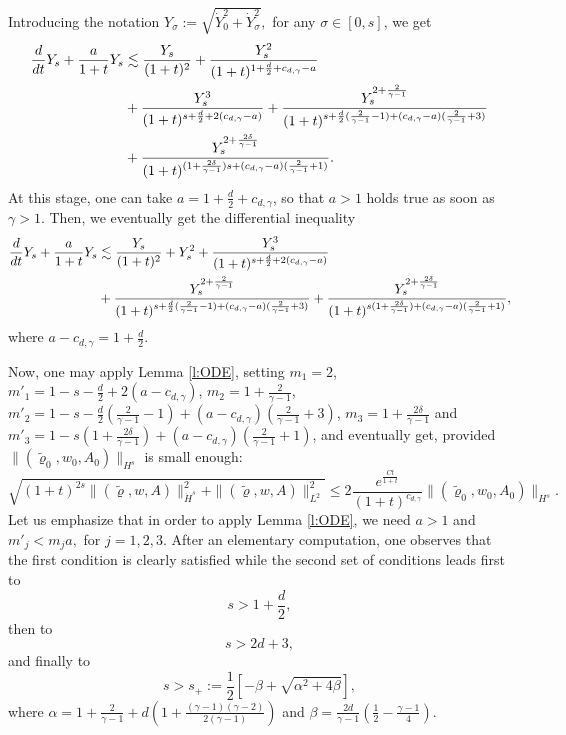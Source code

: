 \documentclass[11pt,twoside]{amsart}
\newcommand{\tildrho}{\tilde{\varrho}}
\begin{document}
 Introducing the notation 
$Y_\sigma:=\sqrt{\dot Y_0^2+\dot Y_\sigma^2},$ for any $\sigma \in [0,s]$, we get
\begin{align}\label{eq:Y_s}
\frac d{dt}Y_s+\frac a{1+t}Y_s
&\lesssim\frac{Y_s}{(1+t)^2}+\frac{Y_s^2}{(1+t)^{1+\frac d2+c_{d,\gamma}-a}} \\
& +\frac{Y_s^3}{(1+t)^{s+\frac{d}{2}+2(c_{d,\gamma}-a)}}
+
\frac{Y_s^{2+\frac{2}{\gamma-1}}}{(1+t)^{s+\frac{d}{2}(\frac{2}{\gamma-1}-1)+(c_{d,\gamma}-a)(\frac{2}{\gamma-1}+3)}}
\notag \\
&
+
\frac{Y_s^{2+\frac{2\delta}{\gamma-1}}}
{
(1+t)^{(1+\frac{2\delta}{\gamma-1})s+(c_{d,\gamma}-a)(\frac{2}{\gamma-1}+1)}
}. \notag 
\end{align} 
At this stage, one can take $a=1+\frac d2+c_{d,\gamma}$, so that $a>1$ holds true as soon as $\gamma>1.$
Then, we eventually get the differential inequality 
\begin{align}\label{eq:Y_s_2}
\frac{d}{dt}Y_s+\frac{a}{1+t}Y_s
&\lesssim\frac{Y_s}{(1+t)^2}+Y_s^2+\frac{Y_s^3}{(1+t)^{s+\frac{d}{2}+2(c_{d,\gamma}-a)}}
\\
&+
\frac{Y_s^{2+\frac{2}{\gamma-1}}}{(1+t)^{s+\frac{d}{2}(\frac{2}{\gamma-1}-1)+(c_{d,\gamma}-a)(\frac{2}{\gamma-1}+3)}}
+
\frac{Y_s^{2+\frac{2\delta}{\gamma-1}}}{(1+t)^{s(1+\frac{2\delta}{\gamma-1})+(c_{d,\gamma}-a)(\frac{2}{\gamma-1}+1)}}, \notag
\end{align}
where $a-c_{d,\gamma}=1+\frac{d}{2}$.

Now,  one may 
apply  Lemma \ref{l:ODE}, setting
$m_1=2$,
$m'_1=1- s-\frac{d}{2}+2(a-c_{d,\gamma})$,
$m_2=1+\frac{2}{\gamma-1}$,
$m'_2=1-s-\frac{d}{2}(\frac{2}{\gamma-1}-1)+(a-c_{d,\gamma})(\frac{2}{\gamma-1}+3)$,
$m_3=1+\frac{2\delta}{\gamma-1}$ and
%
$m'_3=1-s(1+\frac{2\delta}{\gamma-1})+(a-c_{d,\gamma})(\frac{2}{\gamma-1}+1)$,
and eventually get, provided $\|(\tildrho_0,w_0,A_0)\|_{H^s}$ is small enough:
\begin{equation}\label{eq:poissonHs}
\sqrt{(1+t)^{2s}\|(\tildrho,w,A)\|_{\dot H^s}^2+\|(\tildrho,w,A)\|_{L^2}^2}\leq 2\frac{e^{\frac{Ct}{1+t}}}{(1+t)^{c_{d,\gamma}}} \|(\tildrho_0,w_0,A_0)\|_{H^s}.
\end{equation}
Let us emphasize that in order to apply Lemma \ref{l:ODE}, we need  $a>1$ and 
$m'_j<m_ja,$ for $j=1,2,3$. After an elementary computation, one observes that the first condition is clearly satisfied while the second set of conditions leads first to
$$
s>1+\frac{d}{2},
$$
then to
$$
s>2d+3,
$$
and finally to
\begin{equation}
\label{eq:condPs}
s>s_+:=\frac{1}{2}[-\beta+\sqrt{\alpha^2+4\beta}],
\end{equation}
where 
$\alpha=1+\frac{2}{\gamma-1}+d(1+\frac{(\gamma-1)(\gamma-2)}{2(\gamma-1)})$ and 
$\beta=\frac{2d}{\gamma-1}(\frac{1}{2}-\frac{\gamma-1}{4})$.
\end{document}
